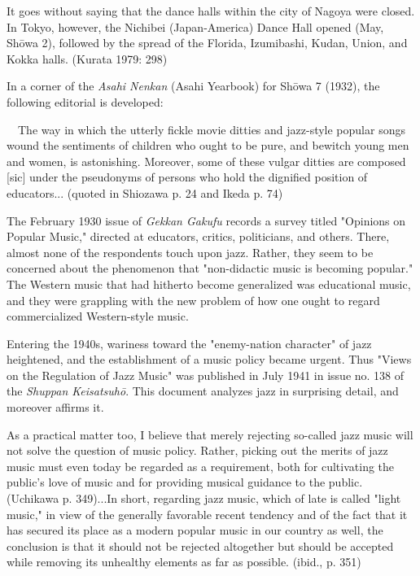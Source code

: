 It goes without saying that the dance halls within the city of Nagoya were closed. In Tokyo, however, the Nichibei (Japan-America) Dance Hall opened (May, Shōwa 2), followed by the spread of the Florida, Izumibashi, Kudan, Union, and Kokka halls. (Kurata 1979: 298)

In a corner of the \textit{Asahi Nenkan} (Asahi Yearbook) for Shōwa 7 (1932), the following editorial is developed:

\begin{gquote}
　The way in which the utterly fickle movie ditties and jazz-style popular songs wound the sentiments of children who ought to be pure, and bewitch young men and women, is astonishing. Moreover, some of these vulgar ditties are composed [sic] under the pseudonyms of persons who hold the dignified position of educators... (quoted in Shiozawa p. 24 and Ikeda p. 74)
\end{gquote}

The February 1930 issue of \textit{Gekkan Gakufu} records a survey titled "Opinions on Popular Music," directed at educators, critics, politicians, and others. There, almost none of the respondents touch upon jazz. Rather, they seem to be concerned about the phenomenon that "non-didactic music is becoming popular." The Western music that had hitherto become generalized was educational music, and they were grappling with the new problem of how one ought to regard commercialized Western-style music.

Entering the 1940s, wariness toward the "enemy-nation character" of jazz heightened, and the establishment of a music policy became urgent. Thus "Views on the Regulation of Jazz Music" was published in July 1941 in issue no. 138 of the \textit{Shuppan Keisatsuhō}. This document analyzes jazz in surprising detail, and moreover affirms it.

\begin{gquote}
As a practical matter too, I believe that merely rejecting so-called jazz music will not solve the question of music policy. Rather, picking out the merits of jazz music must even today be regarded as a requirement, both for cultivating the public's love of music and for providing musical guidance to the public. (Uchikawa p. 349)...In short, regarding jazz music, which of late is called "light music," in view of the generally favorable recent tendency and of the fact that it has secured its place as a modern popular music in our country as well, the conclusion is that it should not be rejected altogether but should be accepted while removing its unhealthy elements as far as possible. (ibid., p. 351)
\end{gquote}

